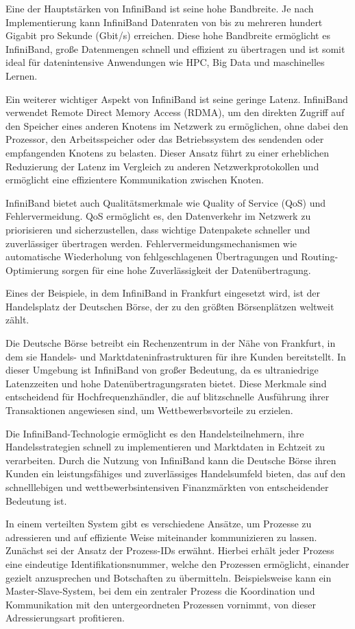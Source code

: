 Eine der Hauptstärken von InfiniBand ist seine hohe Bandbreite. Je nach Implementierung kann InfiniBand Datenraten von bis zu mehreren hundert Gigabit pro Sekunde (Gbit/s) erreichen. Diese hohe Bandbreite ermöglicht es InfiniBand, große Datenmengen schnell und effizient zu übertragen und ist somit ideal für datenintensive Anwendungen wie HPC, Big Data und maschinelles Lernen.

Ein weiterer wichtiger Aspekt von InfiniBand ist seine geringe Latenz. InfiniBand verwendet Remote Direct Memory Access (RDMA), um den direkten Zugriff auf den Speicher eines anderen Knotens im Netzwerk zu ermöglichen, ohne dabei den Prozessor, den Arbeitsspeicher oder das Betriebssystem des sendenden oder empfangenden Knotens zu belasten. Dieser Ansatz führt zu einer erheblichen Reduzierung der Latenz im Vergleich zu anderen Netzwerkprotokollen und ermöglicht eine effizientere Kommunikation zwischen Knoten.

InfiniBand bietet auch Qualitätsmerkmale wie Quality of Service (QoS) und Fehlervermeidung. QoS ermöglicht es, den Datenverkehr im Netzwerk zu priorisieren und sicherzustellen, dass wichtige Datenpakete schneller und zuverlässiger übertragen werden. Fehlervermeidungsmechanismen wie automatische Wiederholung von fehlgeschlagenen Übertragungen und Routing-Optimierung sorgen für eine hohe Zuverlässigkeit der Datenübertragung.

Eines der Beispiele, in dem InfiniBand in Frankfurt eingesetzt wird, ist der Handelsplatz der Deutschen Börse, der zu den größten Börsenplätzen weltweit zählt.

Die Deutsche Börse betreibt ein Rechenzentrum in der Nähe von Frankfurt, in dem sie Handels- und Marktdateninfrastrukturen für ihre Kunden bereitstellt. In dieser Umgebung ist InfiniBand von großer Bedeutung, da es ultraniedrige Latenzzeiten und hohe Datenübertragungsraten bietet. Diese Merkmale sind entscheidend für Hochfrequenzhändler, die auf blitzschnelle Ausführung ihrer Transaktionen angewiesen sind, um Wettbewerbsvorteile zu erzielen.

Die InfiniBand-Technologie ermöglicht es den Handelsteilnehmern, ihre Handelsstrategien schnell zu implementieren und Marktdaten in Echtzeit zu verarbeiten. Durch die Nutzung von InfiniBand kann die Deutsche Börse ihren Kunden ein leistungsfähiges und zuverlässiges Handelsumfeld bieten, das auf den schnelllebigen und wettbewerbsintensiven Finanzmärkten von entscheidender Bedeutung ist.

In einem verteilten System gibt es verschiedene Ansätze, um Prozesse zu adressieren und auf effiziente Weise miteinander kommunizieren zu lassen. Zunächst sei der Ansatz der Prozess-IDs erwähnt. Hierbei erhält jeder Prozess eine eindeutige Identifikationsnummer, welche den Prozessen ermöglicht, einander gezielt anzusprechen und Botschaften zu übermitteln. Beispielsweise kann ein Master-Slave-System, bei dem ein zentraler Prozess die Koordination und Kommunikation mit den untergeordneten Prozessen vornimmt, von dieser Adressierungsart profitieren.

